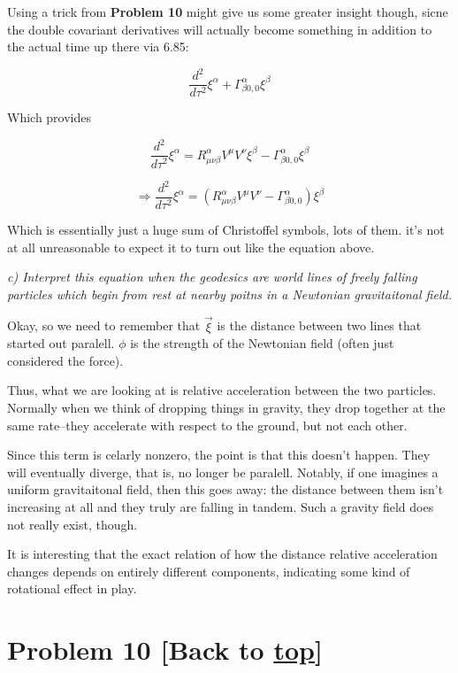 \documentclass[landscape,letterpaper,10pt,english]{article}
\begin{document}
Using a trick from \textbf{Problem 10} might give us some greater
insight though, sicne the double covariant derivatives will actually
become something in addition to the actual time up there via 6.85:

    \[ \frac{d^2}{d\tau^2} \xi^\alpha + \Gamma^\alpha_{\beta 0,0}\xi^\beta \]

Which provides

\[  \frac{d^2}{d\tau^2} \xi^\alpha = R^\alpha_{\mu\nu\beta} V^\mu V^\nu \xi^\beta - \Gamma^\alpha_{\beta 0,0}\xi^\beta \]

\[ \Rightarrow \frac{d^2}{d\tau^2} \xi^\alpha = (R^\alpha_{\mu\nu\beta} V^\mu V^\nu - \Gamma^\alpha_{\beta 0,0} ) \xi^\beta \]

    Which is essentially just a huge sum of Christoffel symbols, lots of
them. it's not at all unreasonable to expect it to turn out like the
equation above.

    \emph{c) Interpret this equation when the geodesics are world lines of
freely falling particles which begin from rest at nearby poitns in a
Newtonian gravitaitonal field.}

    Okay, so we need to remember that \(\vec \xi\) is the distance between
two lines that started out paralell. \(\phi\) is the strength of the
Newtonian field (often just considered the force).

Thus, what we are looking at is relative acceleration between the two
particles. Normally when we think of dropping things in gravity, they
drop together at the same rate--they accelerate with respect to the
ground, but not each other.

Since this term is celarly nonzero, the point is that this doesn't
happen. They will eventually diverge, that is, no longer be paralell.
Notably, if one imagines a uniform gravitaitonal field, then this goes
away: the distance between them isn't increasing at all and they truly
are falling in tandem. Such a gravity field does not really exist,
though.

It is interesting that the exact relation of how the distance relative
acceleration changes depends on entirely different components,
indicating some kind of rotational effect in play.

    \hypertarget{problem-10-back-to-top}{%
\section{\texorpdfstring{Problem 10 {[}Back to
\hyperref[toc]{top}{]}}{Problem 10 {[}Back to {]}}}\label{problem-10-back-to-top}}
\end{document}
